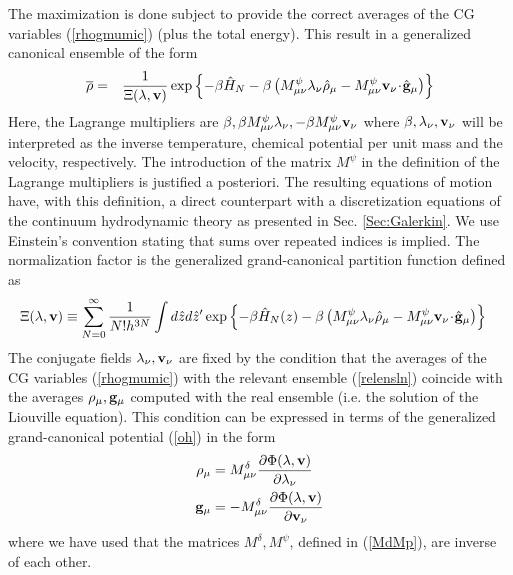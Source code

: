 \documentclass[b5paper,openright,11pt]{book}
\newcommand{\esc}{\!\cdot\!}
\begin{document}
\begin{appendices}
The maximization is done
subject  to  provide   the  correct  averages  of   the  CG  variables
(\ref{rhogmumic})  (plus   the  total   energy).  This  result   in  a
generalized canonical ensemble of the form
\begin{eqnarray}
  \overline{\rho}&=&\frac{1}{\Xi(\lambda,{\bf v})}\exp\left\{-\beta \hat{H}_N
-\beta\left(M^\psi_{\mu\nu}\lambda_\nu \hat{\rho}_{\mu}
-M^\psi_{\mu\nu}{\bf v}_\nu\esc\hat{\bf g}_{\mu}\right)\right\}
\label{relensln}
\end{eqnarray}
Here,      the     Lagrange      multipliers     are      $\beta,\beta
M^\psi_{\mu\nu}\lambda_\nu,-\beta  M^\psi_{\mu\nu}{\bf   v}_\nu$  where
$\beta, \lambda_\nu,{\bf  v}_\nu$ will  be interpreted as  the inverse
temperature,  chemical  potential  per  unit mass  and  the  velocity,
respectively.
The introduction of the matrix $M^\psi$ in the definition of the Lagrange multipliers is justified a posteriori. 
The resulting equations of motion have, with this definition, a direct counterpart with a discretization equations of the continuum hydrodynamic theory as presented in Sec. \ref{Sec:Galerkin}.
We use Einstein’s convention stating that sums over repeated indices is implied.
The   normalization   factor   is   the   generalized
grand-canonical partition function defined as
\begin{align}
&\Xi(\lambda,{\bf v})\equiv \sum_{N=0}^\infty \frac{1}{N!h^{3N}}
  \int d\hat{z}d\hat{z}'
  \exp\left\{-\beta \hat{H}_N(z)-\beta\left( M^\psi_{\mu\nu}\lambda_\nu\hat{\rho}_{\mu}
-M^\psi_{\mu\nu}{\bf v}_\nu\esc\hat{\bf g}_{\mu}\right)\right\}
\label{xiln0}
\end{align}
The  conjugate  fields  $\lambda_\nu,{\bf  v}_\nu$ are  fixed  by  the
condition that the averages of the CG variables (\ref{rhogmumic}) with
the  relevant ensemble  (\ref{relensln})  coincide  with the  averages
$\rho_\mu,{\bf g}_\mu$ computed with the  real ensemble (i.e. the
solution of the Liouville equation). This condition can be expressed in terms of
the generalized grand-canonical potential (\ref{oh})
in the form
\begin{align}
  \rho_\mu &=M^\delta_{\mu\nu}\frac{\partial \Phi(\lambda,{\bf v})}{\partial \lambda_\nu }
\nonumber\\
  {\bf g}_\mu &=-M^\delta_{\mu\nu}\frac{\partial \Phi(\lambda,{\bf v})}{\partial {\bf v}_\nu }
\label{rgoApp}
\end{align}
where we have used that the matrices $M^\delta, M^\psi$, defined in (\ref{MdMp}), are inverse of
each other.  


\end{appendices}
\end{document}
